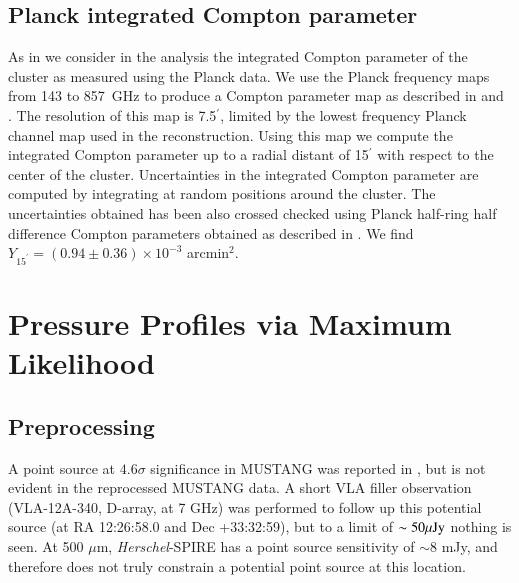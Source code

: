 \documentclass[twocolumn,traditabstract]{aa}
\begin{document}
\subsection{Planck integrated Compton parameter}
As in \citet{adam2015} we consider in the analysis the integrated Compton parameter of the cluster as measured using the Planck data.
We use the Planck frequency maps from 143 to 857~GHz to produce a Compton parameter map as described in \citet{hurier2013} and \citet{planck2013ymap,2016A&A...594A..22P}. The resolution of this map is 7.5$^{\prime}$, limited by the lowest frequency Planck channel map used in the reconstruction. Using this map we compute the integrated Compton parameter up to a radial distant of 15$^{\prime}$ with respect to the center of the cluster. Uncertainties in the integrated Compton parameter are computed by integrating at random positions around the cluster. The uncertainties obtained has been also crossed checked using Planck half-ring half difference Compton parameters obtained as described in \citet{planck2013ymap,2016A&A...594A..22P}. We find $Y_{15^{\prime}} = (0.94 \pm 0.36) \times 10^{-3}$ arcmin$^2$. 


\section{Pressure Profiles via Maximum Likelihood}
\label{sec:ml_deproj}


\subsection{Preprocessing}
\label{sec:preprocessing}


A point source at $4.6\sigma$ significance in MUSTANG was reported in \citet{korngut2011}, but is not
evident in the reprocessed MUSTANG data. A short VLA filler observation (VLA-12A-340, D-array, at 7 GHz) 
was performed to follow up this potential source (at RA 12:26:58.0 and Dec +33:32:59),
but to a limit of $\sim 50 {\rm \mu Jy}$ nothing is seen. At 500 $\mu$m, \emph{Herschel}-SPIRE has a
point source sensitivity of $\sim 8$ mJy, and therefore does not truly constrain a potential point
source at this location.
\end{document}

